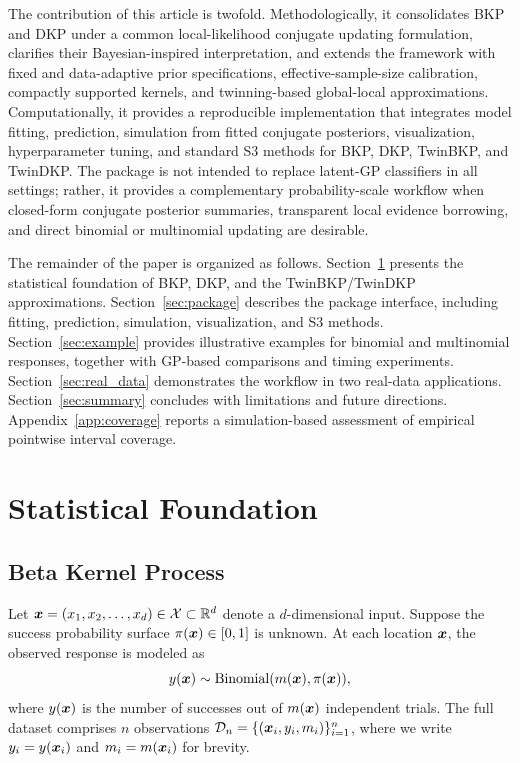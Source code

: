 \documentclass[article, shortnames]{jss}
\renewcommand{\vec}[1]{\mbox{\boldmath ${#1}$}}
\begin{document}
The contribution of this article is twofold. 
Methodologically, it consolidates BKP and DKP under a common local-likelihood conjugate updating formulation, clarifies their Bayesian-inspired interpretation, and extends the framework with fixed and data-adaptive prior specifications, effective-sample-size calibration, compactly supported kernels, and twinning-based global-local approximations. 
Computationally, it provides a reproducible  implementation that integrates model fitting, prediction, simulation from fitted conjugate posteriors, visualization, hyperparameter tuning, and standard S3 methods for BKP, DKP, TwinBKP, and TwinDKP. The package is not intended to replace latent-GP classifiers in all settings; rather, it provides a complementary probability-scale workflow when closed-form conjugate posterior summaries, transparent local evidence borrowing, and direct binomial or multinomial updating are desirable.

The remainder of the paper is organized as follows. 
Section~\ref{sec:model} presents the statistical foundation of BKP, DKP, and the TwinBKP/TwinDKP approximations. 
Section~\ref{sec:package} describes the package interface, including fitting, prediction, simulation, visualization, and S3 methods. 
Section~\ref{sec:example} provides illustrative examples for binomial and multinomial responses, together with GP-based comparisons and timing experiments. 
Section~\ref{sec:real_data} demonstrates the workflow in two real-data applications. 
Section~\ref{sec:summary} concludes with limitations and future directions.
Appendix~\ref{app:coverage} reports a simulation-based assessment of empirical pointwise interval coverage.

\section{Statistical Foundation} \label{sec:model}
 
\subsection{Beta Kernel Process}\label{sec:review-bkp}

Let $\vec{x} = (x_1, x_2, \ldots, x_d) \in \mathcal{X} \subset \mathbb{R}^d$ denote a $d$-dimensional input. Suppose the success probability surface $\pi(\vec{x}) \in [0,1]$ is unknown. 
At each location $\vec{x}$, the observed response is modeled as
\[
	y(\vec{x}) \sim \mathrm{Binomial}(m(\vec{x}), \pi(\vec{x})),
\]
where $y(\vec{x})$ is the number of successes out of $m(\vec{x})$ independent trials. 
The full dataset comprises $n$ observations $\mathcal{D}_n = \{(\vec{x}_i, y_i, m_i)\}_{i=1}^n$, where we write $y_i= y(\vec{x}_i)$ and $m_i= m(\vec{x}_i)$ for brevity.
\end{document}
